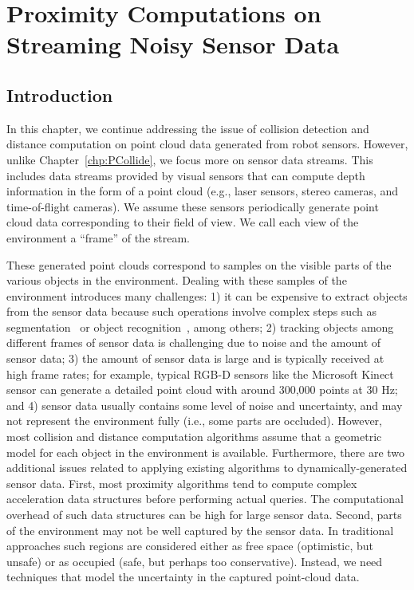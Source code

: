\chapter{Proximity Computations on Streaming Noisy Sensor Data}
\label{chp:PCollide2}


\section{Introduction}

In this chapter, we continue addressing
the issue of collision detection and distance computation on point cloud data generated from robot sensors. However, unlike Chapter~\ref{chp:PCollide}, we focus more on sensor data streams.
This includes data streams provided by visual sensors that can compute depth information in the form of a point cloud (e.g., laser sensors, stereo
cameras, and time-of-flight cameras). We assume these
sensors periodically generate point cloud data corresponding to their
field of view. We call each view of the environment a ``frame'' of the stream.

These generated point clouds correspond to samples on the visible parts
of the various objects in the environment. Dealing with these samples
of the environment introduces many challenges: 1) it can be expensive
to extract objects from the sensor data because such operations involve
complex steps such as segmentation~\cite{Rusu:2009:IROS} or object
recognition~\cite{Muja:2011:ICRA}, among others; 2) tracking objects
among different frames of sensor data is challenging due to noise and the
amount of sensor data; 3) the amount of sensor data is large and is typically
received at high frame rates; for example, typical RGB-D sensors like
the Microsoft Kinect  sensor can generate a detailed point
cloud with around 300,000 points at 30 Hz; and 4) sensor data usually
contains some level of noise and uncertainty, and may not represent
the environment fully (i.e., some parts are occluded). However, most
collision and distance computation algorithms assume that a geometric
model for each object in the environment is available. Furthermore,
there are two additional issues related to applying existing
algorithms to dynamically-generated sensor data. First, most proximity
algorithms tend to compute complex acceleration data structures before
performing actual queries. The computational overhead of such data structures can be high for large sensor data. Second, parts of the environment may not be well captured by the sensor data. In
traditional approaches such regions are considered either as
free space (optimistic, but unsafe) or as occupied (safe, but perhaps
too conservative). Instead, we need techniques that model the uncertainty in the captured point-cloud data.

